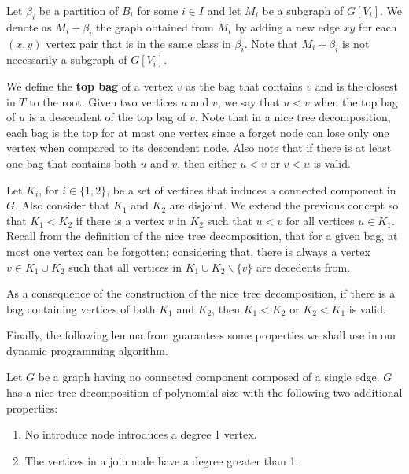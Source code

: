 Let \(\beta_i\) be a partition of \(B_i\) for some \(i \in I\) and let \(M_i\) be a subgraph of \( G[V_i]\). We denote as \(M_i + \beta_i\) the graph obtained from $M_i$ by adding a new edge \(xy\) for each \((x, y)\) vertex pair that is in the same class in \(\beta_i\). Note that \(M_i + \beta_i\) is not necessarily a subgraph of \(G[V_i]\).

We define the \textbf{top bag} of a vertex \(v\) as the bag that contains \(v\) and is the closest in $T$ to the root.
Given two vertices \(u\) and \(v\), we say that \(u < v\) when the top bag of \(u\) is a descendent of the top bag of \(v\). Note that in a nice tree decomposition, each bag is the top for at most one vertex since a forget node can lose only one vertex when compared to its descendent node. Also note that if there is at least one bag that contains both \(u\) and \(v\), then either \(u < v\) or \(v < u\) is valid.

Let \(K_i\), for \(i \in \{1, 2\}\), be a set of vertices that induces a connected component in \(G\). Also consider that \(K_1\) and \(K_2\) are disjoint. We extend the previous concept so that \(K_1 < K_2\) if there is a vertex \(v\) in \(K_2\) such that \(u < v\) for all vertices \(u \in K_1\). Recall from the definition of the nice tree decomposition, that for a given bag, at most one vertex can be forgotten; considering that, there is always a vertex \(v \in K_1 \cup K_2\) such that all vertices in \(K_1 \cup K_2 \backslash \{v\}\) are decedents from.

As a consequence of the construction of the nice tree decomposition, if there is a bag containing vertices of both \(K_1\) and \(K_2\), then \(K_1 < K_2\) or \(K_2 < K_1\) is valid.

Finally, the following lemma from \cite{Bateni} guarantees some properties we shall use in our dynamic programming algorithm.

\begin{lemma}\label{bateni_2_1}
Let \(G\) be a graph having no connected component composed of a single edge. \(G\) has a nice tree decomposition of polynomial size with the following two additional properties:

\begin{enumerate}
    \item No introduce node introduces a degree 1 vertex.
    \item The vertices in a join node have a degree greater than 1.
\end{enumerate}

\end{lemma}

